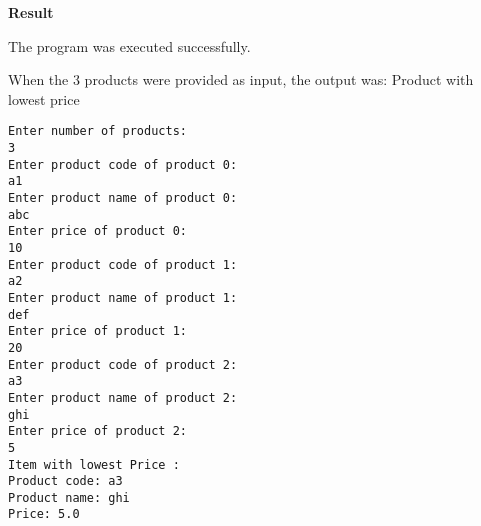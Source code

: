 \vspace{0.5cm}
\textbf{Result}
\vspace{0.5cm}

The program was executed successfully. 

When the 3 products were provided as input, the output was: Product with lowest price
\begin{verbatim}
Enter number of products: 
3
Enter product code of product 0: 
a1
Enter product name of product 0: 
abc
Enter price of product 0: 
10
Enter product code of product 1: 
a2
Enter product name of product 1: 
def
Enter price of product 1: 
20
Enter product code of product 2: 
a3
Enter product name of product 2: 
ghi
Enter price of product 2: 
5
Item with lowest Price : 
Product code: a3
Product name: ghi
Price: 5.0
\end{verbatim}

